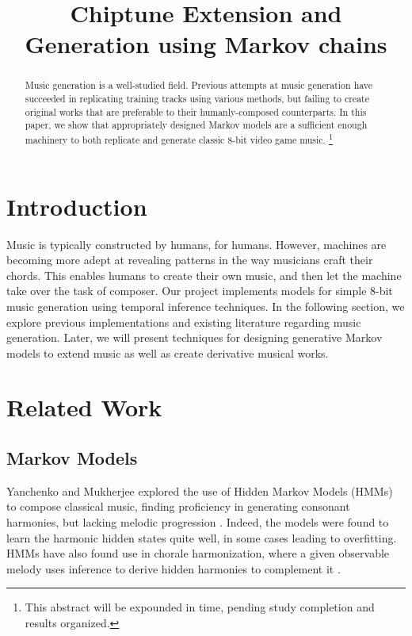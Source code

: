 \documentclass{article}
\title{Chiptune Extension and Generation using Markov chains}
\begin{document}
\maketitle

\begin{abstract}
Music generation is a well-studied field. Previous attempts at music generation have succeeded in replicating training tracks using various methods, but failing to 
create original works that are preferable to their humanly-composed counterparts. In this paper, we show that appropriately designed Markov models are a sufficient 
enough machinery to both replicate and generate classic 8-bit video game music. 
\footnote{This abstract will be expounded in time, pending study completion and results organized.}
\end{abstract}

\section{Introduction}
Music is typically constructed by humans, for humans. However, machines are becoming more adept at revealing patterns in the way musicians craft their chords. 
This enables humans to create their own music, and then let the machine take over the task of composer. Our project implements models for simple 8-bit music 
generation using temporal inference techniques. In the following section, we explore previous implementations and existing literature regarding music generation. 
Later, we will present techniques for designing generative Markov models to extend music as well as create derivative musical works.

\section{Related Work}
\subsection{Markov Models}
Yanchenko and Mukherjee explored the use of Hidden Markov Models (HMMs) to compose classical music, finding proficiency in generating consonant harmonies, but 
lacking melodic progression \cite{yanchenko_2017}. Indeed, the models were found to learn the harmonic hidden states quite well, in some cases leading to overfitting. 
HMMs have also found use in chorale harmonization, where a given observable melody uses inference to derive hidden harmonies to complement it \cite{allan_2005}. 
\end{document}
